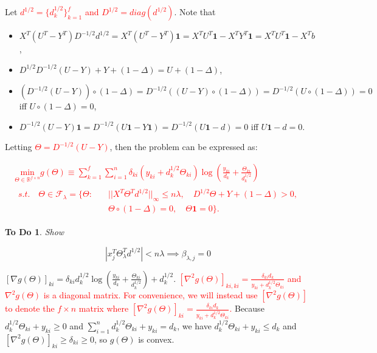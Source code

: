 \documentclass{article}
\newtheorem{todo}{To Do}
\providecommand{\note}[1]{\textcolor{red}{#1}}
\begin{document}
Let \note{$d^{1/2}=\{d_k^{1/2}\}_{k=1}^f$ and $D^{1/2}=diag(d^{1/2})$}. Note that \begin{itemize}
    \item $X^T(U^T-Y^T)D^{-1/2}d^{1/2}=X^T(U^T-Y^T)\mathbf{1}=X^TU^T\mathbf{1}-X^TY^T\mathbf{1}=X^TU^T\mathbf{1}-X^Tb$,
    \item $D^{1/2}D^{-1/2}(U-Y)+Y+(1-\Delta)=U+(1-\Delta)$,
    \item $\left(D^{-1/2}(U-Y)\right)\circ(1-\Delta)=D^{-1/2}\left((U-Y)\circ(1-\Delta)\right)=D^{-1/2}\left(U\circ(1-\Delta)\right)=0$ iff $U\circ(1-\Delta)=0$,
    \item $D^{-1/2}(U-Y)\mathbf{1}=D^{-1/2}(U\mathbf{1}-Y\mathbf{1})=D^{-1/2}(U\mathbf{1}-d)=0$ iff $U\mathbf{1}-d=0$.
\end{itemize}

Letting \note{$\Theta=D^{-1/2}(U-Y)$}, then the problem can be expressed as:

\note{
\begin{gather}
        \label{eq:dualTheta}
        \underset{\Theta\in \mathbb{R}^{f\times n}}{\mathrm{min}}g(\Theta)\equiv\sum_{k=1}^f\sum_{i=1}^n\delta_{ki}(y_{ki}+d_k^{1/2}\Theta_{ki})\log\left(\frac{y_{ki}}{d_k}+\frac{\Theta_{ki}}{d_k^{1/2}}\right)\\
        \begin{aligned}s.t.\quad \Theta\in \mathcal{F}_\lambda=\{\Theta:\quad
            &||X^T\Theta^Td^{1/2}||_\infty\leq n\lambda,\quad D^{1/2}\Theta+Y+(1-\Delta)> 0,\\& \Theta\circ(1-\Delta)=0,\quad \Theta\mathbf{1}=0\}\nonumber.
        \end{aligned}
\end{gather}
}
\begin{todo}
    Show 
    
    \begin{equation}
        \label{eq:kkt}
        \left|x_j^T\Theta_\lambda^Td^{1/2}\right|<n\lambda\implies\beta_{\lambda,j}=0
    \end{equation}
\end{todo}

$[\nabla g(\Theta)]_{ki}=\delta_{ki}d_k^{1/2}\log\left(\frac{y_{ki}}{d_k}+\frac{\Theta_{ki}}{d_k^{1/2}}\right)+d_k^{1/2}$. \note{$[\nabla^2 g(\Theta)]_{ki,ki}=\frac{\delta_{ki}d_k}{y_{ki}+d_k^{1/2}\Theta_{ki}}$ and $\nabla^2 g(\Theta)$ is a diagonal matrix. For convenience, we will instead use $[\nabla^2 g(\Theta)]$ to denote the $f\times n$ matrix where $[\nabla^2 g(\Theta)]_{ki}=\frac{\delta_{ki}d_k}{y_{ki}+d_k^{1/2}\Theta_{ki}}$.} Because $d_k^{1/2}\Theta_{ki}+y_{ki}\geq 0$ and $\sum_{i=1}^nd_k^{1/2}\Theta_{ki}+y_{ki}=d_k$, we have $d_k^{1/2}\Theta_{ki}+y_{ki}\leq d_k$ and $[\nabla^2 g(\Theta)]_{ki}\geq\delta_{ki}\geq 0$, so $g(\Theta)$ is convex.
\end{document}
